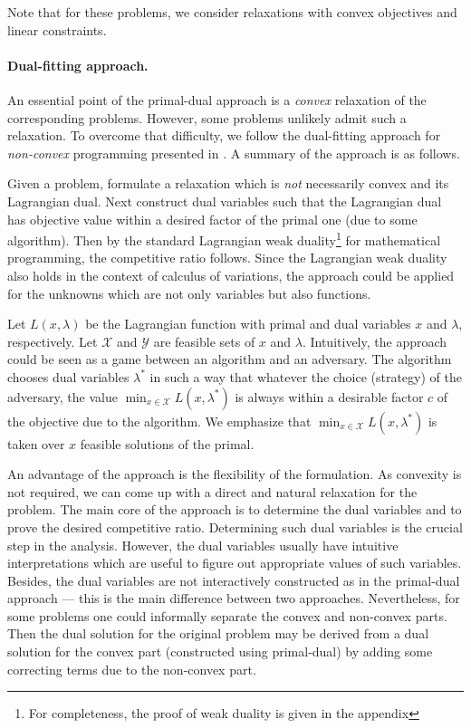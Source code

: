 \documentclass[11pt]{article}
\begin{document}
Note that for these problems, we consider relaxations with convex objectives and linear constraints.

\paragraph{Dual-fitting approach.} 
An essential point of the primal-dual approach is a \emph{convex} relaxation 
of the corresponding problems. However, some problems unlikely admit such a relaxation. 
To overcome that difficulty, we follow the dual-fitting approach for \emph{non-convex}
programming presented in \cite{Thang13:Lagrangian-Duality}. A summary of the approach is as 
follows.

Given a problem, formulate a relaxation which is \emph{not} necessarily convex and its Lagrangian dual. 
Next construct dual variables such that the Lagrangian dual has objective value within a desired factor 
of the primal one (due to some algorithm). Then by the standard Lagrangian weak 
duality\footnote{For completeness, the proof of weak duality is given in the appendix} 
for mathematical programming, the competitive ratio follows. Since the Lagrangian weak 
duality also holds in the context of calculus of variations, the approach could be applied 
for the unknowns which are not only variables but also functions.  

Let $L(x,\lambda)$ be the Lagrangian function with primal and dual variables $x$
and $\lambda$, respectively. 
Let $\mathcal{X}$ and $\mathcal{Y}$ are feasible sets of $x$ and $\lambda$.
Intuitively, the approach could be seen as a game between an algorithm
and an adversary. The algorithm chooses dual variables $\lambda^{*}$ in such a way that whatever 
the choice (strategy) of the adversary, the value $\min_{x \in \mathcal{X}} L(x,\lambda^{*})$
is always within a desirable factor $c$ of the objective due to the algorithm.
We emphasize that $\min_{x \in \mathcal{X}} L(x,\lambda^{*})$ is taken over $x$ feasible solutions 
of the primal.

An advantage of the approach is the flexibility of the formulation. 
As convexity is not required, we can come up with a direct and natural relaxation for the problem.
The main core of the approach is to determine the dual variables
and to prove the desired competitive ratio. Determining such dual variables is the crucial 
step in the analysis. However, the dual variables usually have intuitive interpretations which are useful  
to figure out appropriate values of such variables. Besides, the dual variables are not interactively 
constructed as in the primal-dual approach --- this is the main difference between two approaches.
Nevertheless, for some problems one could informally separate the convex and non-convex parts. Then 
the dual solution for the original problem may be derived from 
a dual solution for the convex part (constructed using primal-dual) by
adding some correcting terms due to the non-convex part. 
\end{document}
